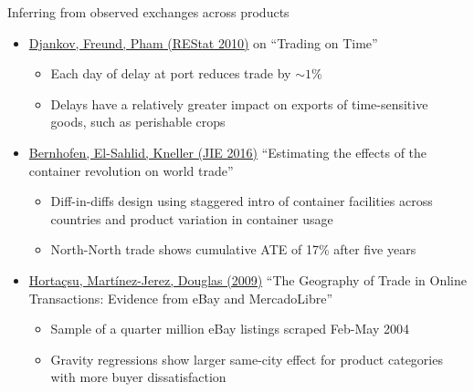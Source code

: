 \documentclass[10pt,notes=hide,aspectratio=169]{beamer}
\begin{document}
\begin{frame}{Inferring from observed exchanges across products}
\begin{itemize}
\item \href{https://www.mitpressjournals.org/doi/10.1162/rest.2009.11498}{Djankov, Freund, Pham (REStat 2010)} on ``Trading on Time''
\begin{itemize}
	\item Each day of delay at port reduces trade by $\sim 1\%$
	\item Delays have a relatively greater impact on exports of time-sensitive goods, such as perishable crops
\end{itemize}
\item \href{https://www.sciencedirect.com/science/article/pii/S0022199615001403}{Bernhofen, El-Sahlid, Kneller (JIE 2016)} ``Estimating the effects of the container revolution on world trade''
\begin{itemize}
	\item Diff-in-diffs design using staggered intro of container facilities across countries and product variation in container usage
	\item North-North trade shows cumulative ATE of 17\%  after five years
\end{itemize}
\item \href{http://www.jstor.org/stable/25760347}{Horta\c{c}su, Mart\'{i}nez-Jerez, Douglas (2009)} ``The Geography of Trade in Online Transactions: Evidence from eBay and MercadoLibre''
\begin{itemize}
	\item Sample of a quarter million eBay listings scraped Feb-May 2004
	\item Gravity regressions show larger same-city effect for product categories with more buyer dissatisfaction
\end{itemize}
\end{itemize}
\end{frame}
\end{document}
